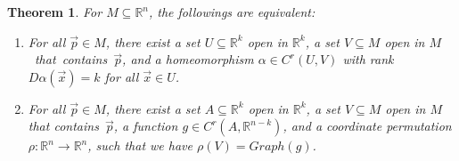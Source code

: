 \documentclass[11pt,oneside]{book}
\theoremstyle{break}
\theoremstyle{break}
\newtheorem{thm}{Theorem}[section]
\newcommand{\R}{\mathbb{R}}
\begin{document}
\begin{thm}
For $M \subseteq  \R^n$, the followings are equivalent:
\begin{enumerate}[topsep=3pt,itemsep=-1ex,partopsep=1ex,parsep=1ex]
\item For all $\vec{p}\in M$, there exist a set $U\subseteq \R^k$ open in $\R^k$, a set $V \subseteq M$ open in \mbox{$M$ that contains $\vec{p}$,} and a homeomorphism $\alpha \in C^r(U,V)$ with rank $D\alpha(\vec{x}) = k$ for all $\vec{x}\in U$.  
\item For all $\vec{p}\in M$, there exist a set $A \subseteq \R^k$ open in $\R^k$, a set $V\subseteq M$ open in $M$ that \mbox{contains $\vec{p}$,} a function $g\in C^r(A,\R^{n-k})$, and a coordinate permutation $\rho:\R^n \to \R^n$, such that we have $\rho(V) = Graph(g)$.  
\end{enumerate}
\end{thm}
\end{document}
